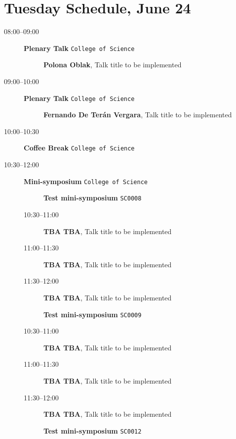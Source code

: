 \documentclass[ILAS2025-program.tex]{subfiles}
\begin{document}
\section{Tuesday Schedule, June 24}
    
    \begin{description}
    \item[08:00--09:00] \textbf{Plenary Talk} {\footnotesize\texttt{College of Science}}
    \begin{description}
        \item[] \textbf{Polona Oblak}, Talk title to be implemented
        \end{description}
        \item[09:00--10:00] \textbf{Plenary Talk} {\footnotesize\texttt{College of Science}}
    \begin{description}
        \item[] \textbf{Fernando De Terán Vergara}, Talk title to be implemented
        \end{description}
        \item[10:00--10:30] \textbf{Coffee Break} {\footnotesize\texttt{College of Science}}
    \item[10:30--12:00] \textbf{Mini-symposium} {\footnotesize\texttt{College of Science}}
    \begin{description}
    \item[] \textbf{Test mini-symposium} {\footnotesize\texttt{SC0008}}
    \item[10:30--11:00] \textbf{TBA TBA}, Talk title to be implemented
        \item[11:00--11:30] \textbf{TBA TBA}, Talk title to be implemented
        \item[11:30--12:00] \textbf{TBA TBA}, Talk title to be implemented
        \end{description}
    \begin{description}
    \item[] \textbf{Test mini-symposium} {\footnotesize\texttt{SC0009}}
    \item[10:30--11:00] \textbf{TBA TBA}, Talk title to be implemented
        \item[11:00--11:30] \textbf{TBA TBA}, Talk title to be implemented
        \item[11:30--12:00] \textbf{TBA TBA}, Talk title to be implemented
        \end{description}
    \begin{description}
    \item[] \textbf{Test mini-symposium} {\footnotesize\texttt{SC0012}}

\end{description}
\end{description}
\end{document}
